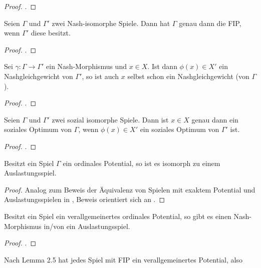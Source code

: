 \begin{proof}.
	
\end{proof}

\begin{lemma}
	Seien $\Gamma$ und $\Gamma'$ zwei Nash-isomorphe Spiele. Dann hat $\Gamma$ genau dann die FIP, wenn $\Gamma'$ diese besitzt.
\end{lemma}

\begin{proof}.
	
\end{proof}

\begin{lemma}
	Sei $\gamma: \Gamma \to \Gamma'$ ein Nash-Morphismus und $x \in X$. Ist dann $\phi(x) \in X'$ ein Nashgleichgewicht von $\Gamma'$, so ist auch $x$ selbst schon ein Nashgleichgewicht (von $\Gamma$).
\end{lemma}

\begin{proof}
	.
	
\end{proof}

\begin{lemma}
	Seien $\Gamma$ und $\Gamma'$ zwei sozial isomorphe Spiele. Dann ist $x \in X$ genau dann ein soziales Optimum von $\Gamma$, wenn $\phi(x) \in X'$ ein soziales Optimum von $\Gamma'$ ist.
\end{lemma}

\begin{proof}
	.
	
\end{proof}

\begin{satz}
	Besitzt ein Spiel $\Gamma$ ein ordinales Potential, so ist es isomorph zu einem Auslastungsspiel.
\end{satz}

\begin{proof}
	Analog zum Beweis der Äquivalenz von Spielen mit exaktem Potential und Auslastungsspielen in \cite{MonShap}, Beweis orientiert sich an \cite{MultiPotGames}.
\end{proof}

\begin{beob}
	Besitzt ein Spiel ein verallgemeinertes ordinales Potential, so gibt es einen Nash-Morphismus in/von  ein Auslastungsspiel.
\end{beob}

\begin{proof}
	.
\end{proof}

\begin{beob}
	Nach \cite{MonShap} Lemma 2.5 hat jedes Spiel mit FIP ein verallgemeinertes Potential, also 
\end{beob}